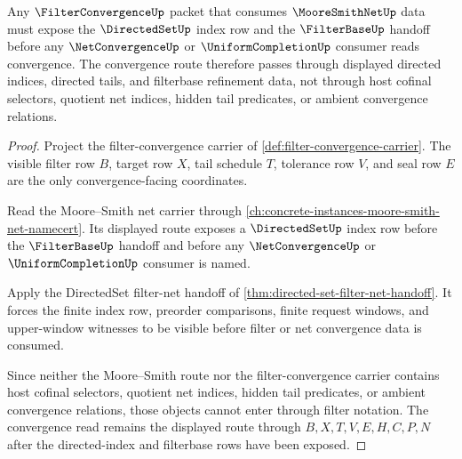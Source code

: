 \begin{theorem}
\label{thm:filter-convergence-directed-net-index}
Any $\FilterConvergenceUp$ packet that consumes $\MooreSmithNetUp$ data must expose the $\DirectedSetUp$ index row and the $\FilterBaseUp$ handoff before any $\NetConvergenceUp$ or $\UniformCompletionUp$ consumer reads convergence. The convergence route therefore passes through displayed directed indices, directed tails, and filterbase refinement data, not through host cofinal selectors, quotient net indices, hidden tail predicates, or ambient convergence relations.
\end{theorem}
\begin{proof}
Project the filter-convergence carrier of \autoref{def:filter-convergence-carrier}. The visible filter row $B$, target row $X$, tail schedule $T$, tolerance row $V$, and seal row $E$ are the only convergence-facing coordinates.

Read the Moore--Smith net carrier through \autoref{ch:concrete-instances-moore-smith-net-namecert}. Its displayed route exposes a $\DirectedSetUp$ index row before the $\FilterBaseUp$ handoff and before any $\NetConvergenceUp$ or $\UniformCompletionUp$ consumer is named.

Apply the DirectedSet filter-net handoff of \autoref{thm:directed-set-filter-net-handoff}. It forces the finite index row, preorder comparisons, finite request windows, and upper-window witnesses to be visible before filter or net convergence data is consumed.

Since neither the Moore--Smith route nor the filter-convergence carrier contains host cofinal selectors, quotient net indices, hidden tail predicates, or ambient convergence relations, those objects cannot enter through filter notation. The convergence read remains the displayed route through $B,X,T,V,E,H,C,P,N$ after the directed-index and filterbase rows have been exposed.
\end{proof}



